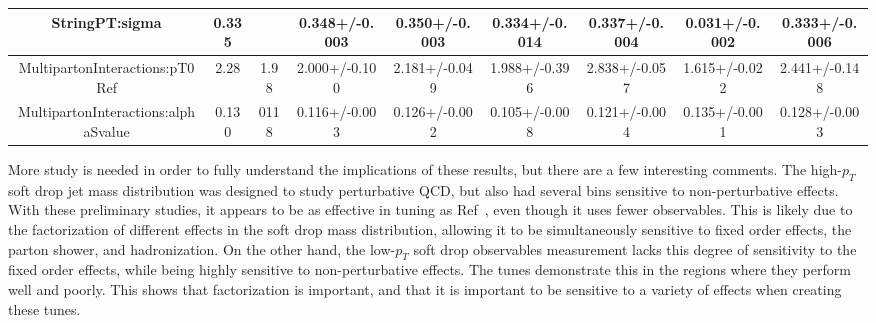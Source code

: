 \begin{landscape}
\begin{table}[ht!]
\begin{tabular}{ | c | | c | c | c | c | c | c | c | c |}
StringPT:sigma                       &  0.335   &        & 0.348+/-0.003 & 0.350+/-0.003 & 0.334+/-0.014 & 0.337+/-0.004 & 0.031+/-0.002 & 0.333+/-0.006 \\ \hline
MultipartonInteractions:pT0Ref       &  2.28    & 1.98   & 2.000+/-0.100 & 2.181+/-0.049 & 1.988+/-0.396 & 2.838+/-0.057 & 1.615+/-0.022 & 2.441+/-0.148 \\ \hline
MultipartonInteractions:alphaSvalue  &  0.130   & 0118   & 0.116+/-0.003 & 0.126+/-0.002 & 0.105+/-0.008 & 0.121+/-0.004 & 0.135+/-0.001 & 0.128+/-0.003 \\ \hline
\end{tabular}
\label{tab:tuneResults}
\end{table}\end{landscape}
\clearpage



More study is needed in order to fully understand the implications of these results, but there are a few interesting comments. 
The high-$p_T$ soft drop jet mass distribution was designed to study perturbative QCD, but also had several bins sensitive to non-perturbative effects. 
With these preliminary studies, it appears to be as effective in tuning as Ref~\cite{jssObs}, even though it uses fewer observables. 
This is likely due to the factorization of different effects in the soft drop mass distribution, allowing it to be simultaneously sensitive to fixed order effects,
the parton shower, and hadronization. On the other hand, the low-$p_T$ soft drop observables measurement lacks this degree of sensitivity to the fixed order effects,
while being highly sensitive to non-perturbative effects. The tunes demonstrate this in the regions where they perform well and poorly. 
This shows that factorization is important, and that it is important to be sensitive to a variety of effects when creating these tunes.








